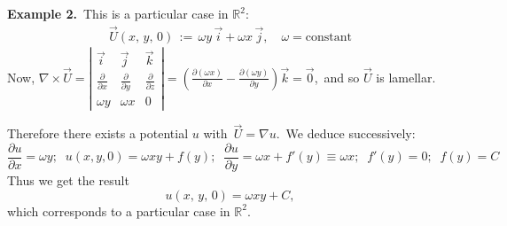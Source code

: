 \documentclass[12pt]{article}
\theoremstyle{definition}
\begin{document}
\textbf{Example 2.}\, This is a particular case in $\mathbb{R}^2$:
\begin{align*}
\vec{U}(x,\,y,\,0) \,:=\, \omega y \,\vec{i}+ \omega x \,\vec{j}, \quad \omega = \mbox{constant}
\end{align*}
Now,\; $\displaystyle\nabla\!\times\!\vec{U} = \left|\begin{matrix}
\vec{i} & \vec{j} & \vec{k}\\
\frac{\partial}{\partial{x}} & \frac{\partial}{\partial{y}} & \frac{\partial}{\partial{z}}\\
\omega y & \omega x & 0
\end{matrix}\right| = 
\left(\frac{\partial(\omega x)}{\partial{x}}-\frac{\partial(\omega y)}{\partial{y}}\right)\vec{k}=\vec{0}$,\, and so $\vec{U}$ is lamellar.

Therefore there exists a potential  $u$ with\, $\vec{U}=\nabla{u}$.\, We deduce successively:
$$\frac{\partial{u}}{\partial{x}} = \omega y; \;\; u(x,y,0) = 
\omega xy+f(y); \;\; \frac{\partial{u}}{\partial{y}}=
\omega x+f'(y)\equiv \omega x; \;\; f'(y)=0; \;\; f(y)=C$$
Thus we get the result
$$u(x,\,y,\,0) = \omega xy+C,$$
which corresponds to a particular case in $\mathbb{R}^2$.\\
\end{document}
